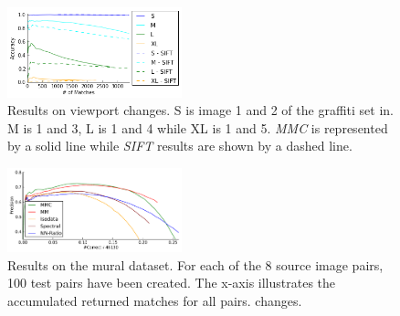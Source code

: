 \documentclass[12pt,journal,compsoc]{IEEEtran}
\begin{document}
%
\begin{figure}
	\centering
	\includegraphics[width=0.45\textwidth]{images/result_viewport}
	\caption{Results on viewport changes. S is image 1 and 2 of the 
	graffiti set in\cite{mikolajczyk2005performance}. M is 1 and 3, L is 
1 and 4 while XL is 1 and 5. \emph{MMC} is represented by a solid line 
while \emph{SIFT} results are shown by a dashed line.}
	\label{fig:result_viewport}
\end{figure}
\begin{figure}
	\centering
	\includegraphics[width=0.45\textwidth]{images/result_accumulated}
	\caption{Results on the mural dataset. For each of the 8 source 
		image pairs, 100 test pairs have been created. The x-axis 
		illustrates the accumulated returned matches for all pairs.
		changes.}
	\label{fig:result_accumulated}
\end{figure}
\end{document}
